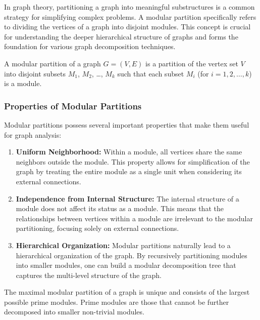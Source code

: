 In graph theory, partitioning a graph into meaningful substructures is a common strategy for simplifying complex problems.
A modular partition specifically refers to dividing the vertices of a graph into disjoint modules.
This concept is crucial for understanding the deeper hierarchical structure of graphs and forms the foundation for various graph decomposition techniques.

\begin{mydef}
    A modular partition of a graph $G = (V, E)$ is a partition of the vertex set $V$ into disjoint subsets $M_1$, $M_2$, \ldots, $M_k$ such that each subset $M_i$ (for $i = 1, 2, \ldots, k$) is a module.
\end{mydef}

\subsubsection*{Properties of Modular Partitions}

Modular partitions possess several important properties that make them useful for graph analysis:

\begin{enumerate}
    \item \textbf{Uniform Neighborhood:} Within a module, all vertices share the same neighbors outside the module.
    This property allows for simplification of the graph by treating the entire module as a single unit when considering its external connections.
    \item \textbf{Independence from Internal Structure:} The internal structure of a module does not affect its status as a module.
    This means that the relationships between vertices within a module are irrelevant to the modular partitioning, focusing solely on external connections.
    \item \textbf{Hierarchical Organization:} Modular partitions naturally lead to a hierarchical organization of the graph.
    By recursively partitioning modules into smaller modules, one can build a modular decomposition tree that captures the multi-level structure of the graph.
\end{enumerate}


The maximal modular partition of a graph is unique and consists of the largest possible prime modules.
Prime modules are those that cannot be further decomposed into smaller non-trivial modules.

